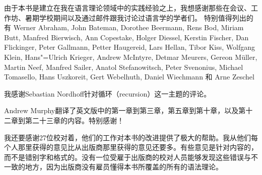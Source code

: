 由于本书是建立在我在语言理论领域中的实践经验之上，我想感谢那些在会议、工作坊、暑期学校期间以及通过邮件跟我讨论过语言学的学者们。
特别值得列出的有
Werner Abraham,
John Bateman,
Dorothee Beermann, 
Rens Bod, 
Miriam Butt,
Manfred Bierwisch,
Ann Copestake, 
Holger Diessel, 
Kerstin Fischer,
Dan Flickinger,
Peter Gallmann, 
Petter Haugereid,
Lars Hellan, 
Tibor Kiss,
Wolfgang Klein, 
Hans"=Ulrich Krieger,
Andrew McIntyre,
Detmar Meurers,
Gereon Müller,
Martin Neef,
Manfred Sailer, 
Anatol Stefanowitsch,
Peter Svenonius,
Michael Tomasello, 
Hans Uszkoreit, 
Gert Webelhuth, 
Daniel Wiechmann 
和
Arne Zeschel 

我感谢Sebastian Nordhoff针对循环（recursion）这一主题的评论。

Andrew Murphy翻译了英文版中的第一章到第三章，第五章到第十章，以及第十二章到第二十三章的内容。特别感谢！

我还要感谢27位校对着，他们的工作对本书的改进提供了极大的帮助。我从他们每个人那里获得的意见比从出版商那里获得的意见还要多。有些意见是针对内容的，而不是错别字和格式的。没有一位受雇于出版商的校对人员能够发现这些错误与不一致的地方，因为出版商没有雇员懂得本书所覆盖的所有的语法理论。

